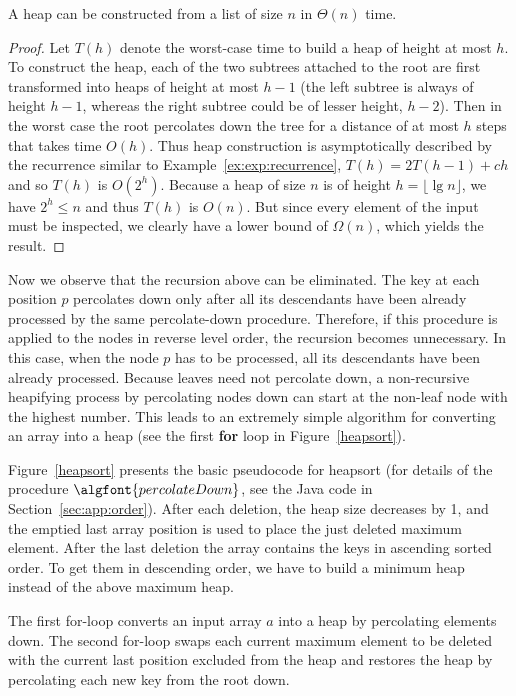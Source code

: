 \begin{Lemma}\label{lem:quickheap}
A heap can be constructed from a list of size $n$ in $\Theta(n)$ time.
\end{Lemma}
\begin{proof}
Let $T(h)$ denote the worst-case time to build a heap of height at most $h$. 
To construct the heap, each of the two subtrees attached to the root are first 
transformed into  heaps of height at most $h-1$ (the left subtree is always of
height $h-1$, whereas the right subtree could be of lesser height, $h-2$). 
Then in the worst case the root percolates down the tree
for a distance of at most $h$ steps that takes time $O(h)$. 
Thus heap construction is asymptotically described by the
recurrence similar to Example~\ref{ex:exp:recurrence}, 
\(
T(h) = 2T(h-1) + ch
\) 
and so $T(h)$ is $O(2^{h})$. Because a heap of size $n$ is of height  
$h = \lfloor \lg n \rfloor$, we have $2^{h} \le n$ and thus 
\(T(h)\) is $O(n)$. But since every element of the input must be inspected, we 
clearly have a lower bound of $\Omega(n)$, which yields the result.
\end{proof}

Now we observe that the recursion above can be eliminated. The key at each position 
$p$ percolates down only after all its descendants have been already processed 
by the same percolate-down procedure.  Therefore, if this procedure is applied to
the nodes in reverse level order, the recursion becomes unnecessary. In
this case, when the node $p$ has to be processed, all its descendants
have been already processed. Because leaves need not percolate down,
a non-recursive heapifying process by percolating nodes down can start
at the non-leaf node with the highest number. This leads to an extremely simple 
algorithm for converting an array into a heap (see the first \textbf{for} loop 
in Figure~\ref{heapsort}).
    
Figure~\ref{heapsort} presents the basic pseudocode for heapsort (for details 
of the procedure $\algfont{percolateDown}$, see the Java code in 
Section~\ref{sec:app:order}). After each deletion, the heap size decreases by 1, 
and the emptied last
array position is used to place the just deleted maximum element. After
the last deletion the array contains the keys in ascending sorted
order. To get them in descending order, we have to build a minimum heap 
instead of the above maximum heap.

The first for-loop converts an input array $a$
into a heap by percolating elements down. The
second for-loop swaps each current maximum
element to be deleted with the current last position
excluded from the heap and restores the heap by percolating
each new key from the root down.

